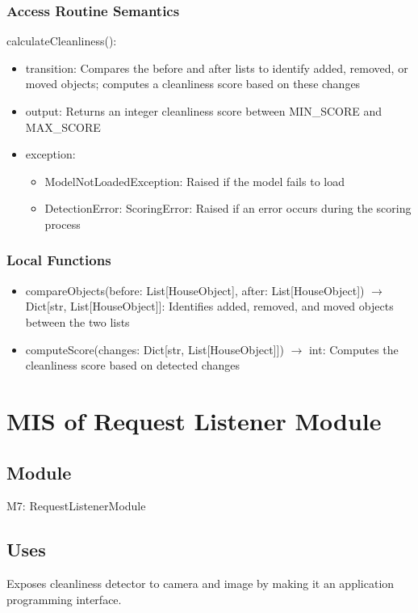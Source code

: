 \documentclass[12pt, titlepage]{article}
\begin{document}
\subsubsection{Access Routine Semantics}

\noindent calculateCleanliness():
\begin{itemize}
\item transition: Compares the before and after lists to identify added, removed, or moved objects; computes a cleanliness score based on these changes
\item output: Returns an integer cleanliness score between MIN{\_}SCORE and MAX{\_}SCORE
\item exception: 
\begin{itemize}
  \item ModelNotLoadedException: Raised if the model fails to load
  \item DetectionError: ScoringError: Raised if an error occurs during the scoring process
\end{itemize}

\end{itemize}


\subsubsection{Local Functions}

\begin{itemize}
  \item compareObjects(before: List[HouseObject], after: List[HouseObject]) $\rightarrow$ Dict[str, List[HouseObject]]: Identifies added, removed, and moved objects between the two lists
  \item computeScore(changes: Dict[str, List[HouseObject]]) $\rightarrow$ int: Computes the cleanliness score based on detected changes
\end{itemize}

\newpage
\section{MIS of Request Listener Module} \label{Module} 

\subsection{Module}

M7: RequestListenerModule

\subsection{Uses}
Exposes cleanliness detector to camera and image by making it an application programming interface.
\end{document}
